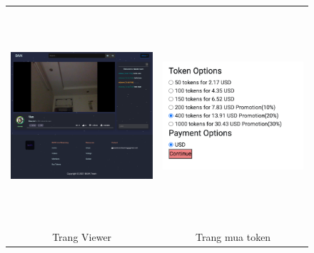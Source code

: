 \begin{center}
\begin{figure}[H]
\begin{tabular}{cc}
  \includegraphics[width=8.5cm, height=8cm]{./imgs/layouts/viewer} &   \includegraphics[width=8.5cm,height=8cm]{./imgs/layouts/option_buy} \\
Trang Viewer & Trang mua token \\[6pt]
\end{tabular}
\end{figure}
\end{center}


